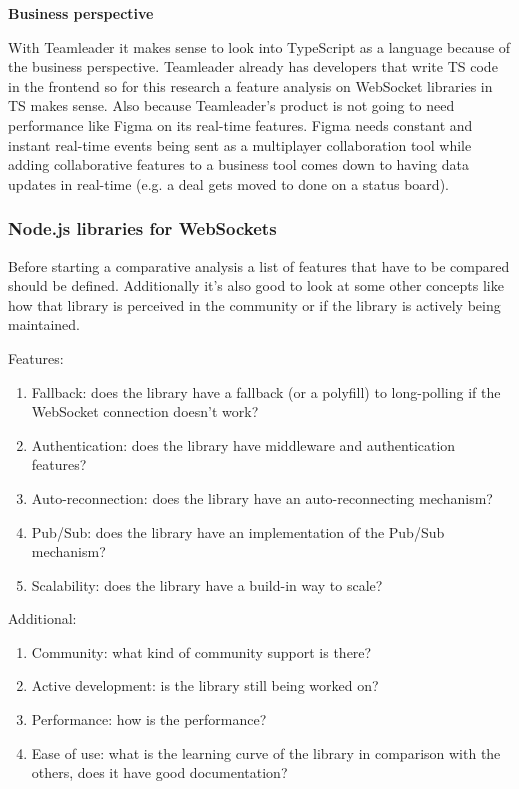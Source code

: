 \textbf{Business perspective}

With Teamleader it makes sense to look into TypeScript as a language because of the business perspective. Teamleader already has developers that write TS code in the frontend so for this research a feature analysis on WebSocket libraries in TS makes sense. Also because Teamleader's product is not going to need performance like Figma on its real-time features. Figma needs constant and instant real-time events being sent as a multiplayer collaboration tool while adding collaborative features to a business tool comes down to having data updates in real-time (e.g. a deal gets moved to done on a status board).

\subsubsection{Node.js libraries for WebSockets}

Before starting a comparative analysis a list of features that have to be compared should be defined. Additionally it's also good to look at some other concepts like how that library is perceived in the community or if the library is actively being maintained.

Features:

\begin{enumerate}
  \item Fallback: does the library have a fallback (or a polyfill) to long-polling if the WebSocket connection doesn't work?
  \item Authentication: does the library have middleware and authentication features?
  \item Auto-reconnection: does the library have an auto-reconnecting mechanism?
  \item Pub/Sub: does the library have an implementation of the Pub/Sub mechanism?
  \item Scalability: does the library have a build-in way to scale?
\end{enumerate}

Additional:

\begin{enumerate}
  \item Community: what kind of community support is there?
  \item Active development: is the library still being worked on?
  \item Performance: how is the performance?
  \item Ease of use: what is the learning curve of the library in comparison with the others, does it have good documentation?
\end{enumerate}


